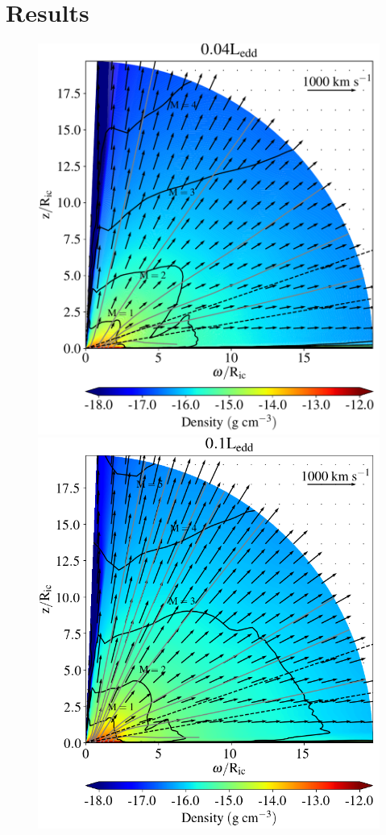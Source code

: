 \documentclass[a4paper,fleqn,usenatbib]{mnras}
\begin{document}
\section{Results}
\label{section:results}



\begin{figure}
\includegraphics[width=\columnwidth]{figures/fig1a_density.pdf}
\includegraphics[width=\columnwidth]{figures/fig1b_density.png}

\end{figure}
\end{document}
